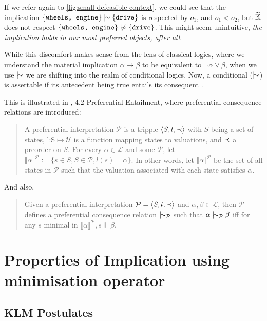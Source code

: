 \documentclass[11pt]{article}
\begin{document}
If we refer again to \autoref{fig:small-defeasible-context}, we could see that the implication $\{\texttt{wheels, engine}\} \twiddle \{\texttt{drive}\}$ is respected by $o_1$, and $o_1 < o_2$, but $\widetilde{\mathbb{K}}$ does not respect $\{\texttt{wheels, engine}\} \ntwiddle \{\texttt{drive}\}$. This might seem unintuitive, \textit{the implication holds in our most preferred objects, after all}.

While this discomfort makes sense from the lens of classical logics, where we understand the material implication $\alpha \rightarrow \beta$ to be equivalent to $\neg \alpha \lor \beta$, when we use $\twiddle$ we are shifting into the realm of conditional logics. Now, a conditional ($\twiddle$) is assertable if its antecedent being true entails its consequent \cite{sep-logic-conditionals}.

This is illustrated in \cite{kaliski2020overview}, $4.2$ Preferential Entailment, where preferential consequence relations are introduced:
\begin{quotation}
  A preferential interpretation $\mathcal{P}$ is a tripple $\langle S, l, \prec \rangle$ with $S$ being a set of states, l:S$\mapsto \mathcal{U}$ is a function mapping states to valuations, and $\prec$ a preorder on $S$. For every $\alpha \in \mathcal{L}$ and some $\mathcal{P}$, let $\llbracket \alpha \rrbracket^{\mathcal{P}}:= \{s\in S, S\in \mathcal{P}, l(s) \Vdash \alpha\}$. In other words, let $\llbracket \alpha \rrbracket^{\mathcal{P}}$ be the set of all states in $\mathcal{P}$ such that the valuation associated with each state satisfies $\alpha$.
\end{quotation}

And also,
\begin{quotation}
  Given a preferential interpretation $\mathcal{P} = \langle S, l, \prec \rangle$ and $\alpha, \beta \in \mathcal{L}$, then $\mathcal{P}$ defines a preferential consequence relation $\twiddle_{\mathcal{P}}$ such that $\alpha \twiddle_{\mathcal{P}} \beta$ iff for any $s$ minimal in $\llbracket \alpha \rrbracket^{\mathcal{P}}, s \Vdash \beta$.
\end{quotation}

\clearpage
\section{Properties of Implication using minimisation operator}
\subsection{KLM Postulates}
\end{document}
